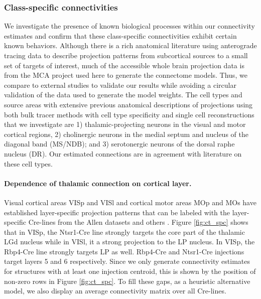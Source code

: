 \newpage
\subsubsection{Class-specific connectivities}
\label{sec:class-specific-connectivities}
We investigate the presence of known biological processes within our connectivity estimates and confirm that these class-specific connectivities exhibit certain known behaviors.
Although there is a rich anatomical literature using anterograde tracing data to describe projection patterns from subcortical sources to a small set of targets of interest, much of the accessible whole brain projection data is from the MCA project used here to generate the connectome models.
Thus, we compare to external studies to validate our results while avoiding a circular validation of the data used to generate the model weights.
The cell types and source areas with extensive previous anatomical descriptions of projections using both bulk tracer methods with cell type specificity and single cell reconstructions that we investigate are 1) thalamic-projecting neurons in the visual and motor cortical regions, 2) cholinergic neurons in the medial septum and nucleus of the diagonal band (MS/NDB);
and 3) serotonergic neurons of the dorsal raphe nucleus (DR).
Our estimated connections are in agreement with literature on these cell types.

\paragraph{Dependence of thalamic connection on cortical layer.}

Visual cortical areas VISp and VISl and cortical motor areas MOp and MOs have established layer-specific projection patterns that can be labeled with the layer-specific Cre-lines from the Allen datasets and others \citet{Jeong2016-dc, Harris2019-mr}.
Figure \ref{fig:ct_spc} shows that in VISp, the Ntsr1-Cre line strongly targets the core part of the thalamic LGd nucleus while in VISl, it a strong projection to the LP nucleus.
In VISp, the Rbp4-Cre line strongly targets LP as well.  
Rbp4-Cre and Ntsr1-Cre injections target layers 5 and 6 respectively.
Since we only generate connectivity estimates for structures with at least one injection centroid, this is shown by the position of non-zero rows in Figure \ref{fig:ct_spc}.
To fill these gaps, as a heuristic alternative model, we also display an average connectivity matrix over all Cre-lines.

